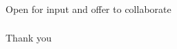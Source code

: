 \documentclass{beamer}
\begin{document}
\begin{frame}
  \frametitle{}
  \begin{block}{}
    Open for input and offer to collaborate
  \end{block}
\end{frame}


\begin{frame}
  \frametitle{}
  \begin{block}{}
    \begin{center}
      Thank you
      \end{center}    
  \end{block}
\end{frame}
\end{document}
